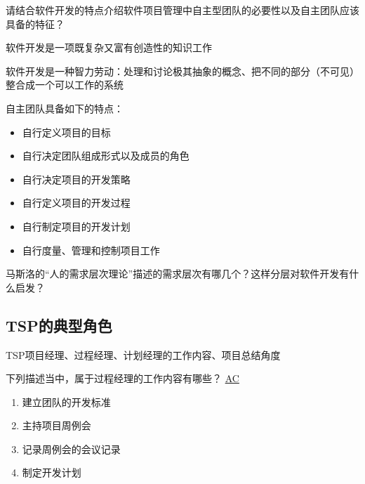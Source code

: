 \begin{problem}
请结合软件开发的特点介绍软件项目管理中自主型团队的必要性以及自主团队应该具备的特征？

软件开发是一项既复杂又富有创造性的知识工作

软件开发是一种智力劳动：处理和讨论极其抽象的概念、把不同的部分（不可见）整合成一个可以工作的系统

自主团队具备如下的特点：
\vspace{-0.8em}
\begin{multicols}{2}
    \begin{itemize}
        \item 自行定义项目的目标
        \item 自行决定团队组成形式以及成员的角色
        \item 自行决定项目的开发策略
        \item 自行定义项目的开发过程
        \item 自行制定项目的开发计划
        \item 自行度量、管理和控制项目工作
    \end{itemize}
\end{multicols}
\vspace{-1em}
\end{problem}

\begin{problem}
马斯洛的“人的需求层次理论”描述的需求层次有哪几个？这样分层对软件开发有什么启发？
\end{problem}

\subsection{TSP的典型角色}


\begin{problem}
TSP项目经理、过程经理、计划经理的工作内容、项目总结角度
\end{problem}

\begin{problem}
	下列描述当中，属于过程经理的工作内容有哪些？
	\uline{AC}    
    \vspace{-0.8em}
    \begin{multicols}{2}
        \begin{enumerate}[label=\Alph*.]
            \item 建立团队的开发标准
            \item 主持项目周例会
            \item 记录周例会的会议记录
            \item 制定开发计划
        \end{enumerate}
    \end{multicols}
    \vspace{-1em}
\end{problem}